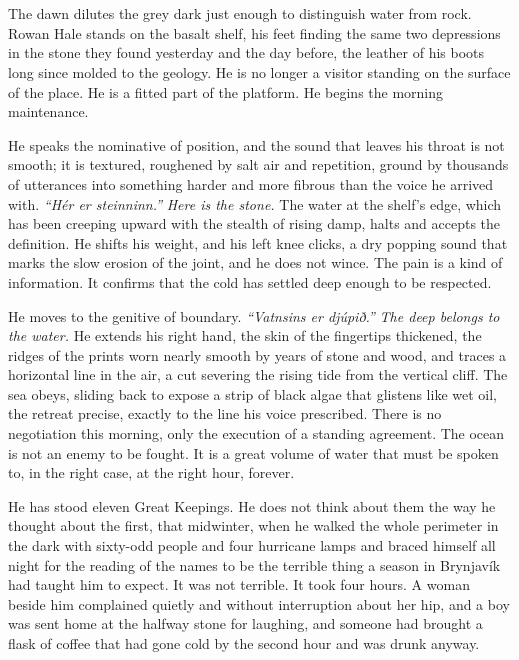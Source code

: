 \documentclass[11pt,oneside]{book}
\begin{document}
\chapter{}

The dawn dilutes the grey dark just enough to distinguish water from
rock. Rowan Hale stands on the basalt shelf, his feet finding the same
two depressions in the stone they found yesterday and the day before,
the leather of his boots long since molded to the geology. He is no
longer a visitor standing on the surface of the place. He is a fitted
part of the platform. He begins the morning maintenance.

He speaks the nominative of position, and the sound that leaves his
throat is not smooth; it is textured, roughened by salt air and
repetition, ground by thousands of utterances into something harder and
more fibrous than the voice he arrived with. \emph{``Hér er
steinninn.''} \emph{Here is the stone.} The water at the shelf's edge,
which has been creeping upward with the stealth of rising damp, halts
and accepts the definition. He shifts his weight, and his left knee
clicks, a dry popping sound that marks the slow erosion of the joint,
and he does not wince. The pain is a kind of information. It confirms
that the cold has settled deep enough to be respected.

He moves to the genitive of boundary. \emph{``Vatnsins er djúpið.''}
\emph{The deep belongs to the water.} He extends his right hand, the
skin of the fingertips thickened, the ridges of the prints worn nearly
smooth by years of stone and wood, and traces a horizontal line in the
air, a cut severing the rising tide from the vertical cliff. The sea
obeys, sliding back to expose a strip of black algae that glistens like
wet oil, the retreat precise, exactly to the line his voice prescribed.
There is no negotiation this morning, only the execution of a standing
agreement. The ocean is not an enemy to be fought. It is a great volume
of water that must be spoken to, in the right case, at the right hour,
forever.

He has stood eleven Great Keepings. He does not think about them the way
he thought about the first, that midwinter, when he walked the whole
perimeter in the dark with sixty-odd people and four hurricane lamps and
braced himself all night for the reading of the names to be the terrible
thing a season in Brynjavík had taught him to expect. It was not
terrible. It took four hours. A woman beside him complained quietly and
without interruption about her hip, and a boy was sent home at the
halfway stone for laughing, and someone had brought a flask of coffee
that had gone cold by the second hour and was drunk anyway.
\end{document}
